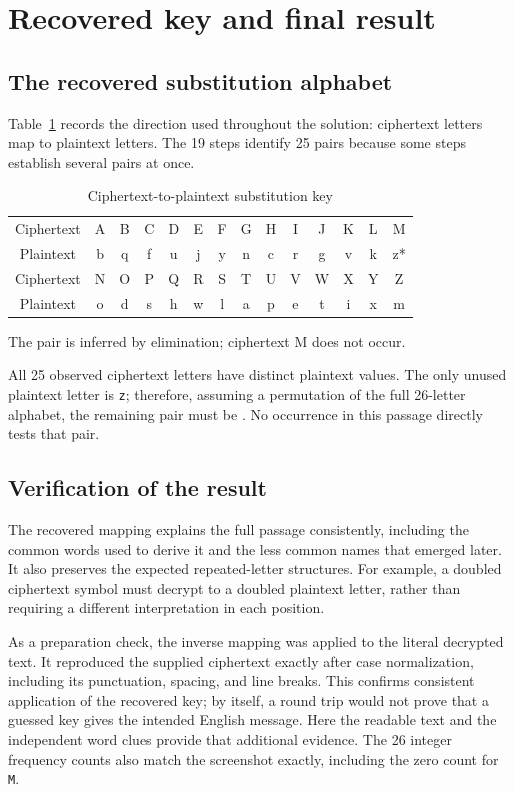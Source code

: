 \section{Recovered key and final result}
\subsection{The recovered substitution alphabet}
Table~\ref{tab:key} records the direction used throughout the solution: ciphertext letters map to plaintext letters. The 19 steps identify 25 pairs because some steps establish several pairs at once.

\begin{table}[htbp]
\centering
\caption{Ciphertext-to-plaintext substitution key}
\label{tab:key}
\small
\begin{tabular}{c*{13}{c}}
\hline
Ciphertext & A & B & C & D & E & F & G & H & I & J & K & L & M\\
Plaintext & b & q & f & u & j & y & n & c & r & g & v & k & z*\\
\hline
Ciphertext & N & O & P & Q & R & S & T & U & V & W & X & Y & Z\\
Plaintext & o & d & s & h & w & l & a & p & e & t & i & x & m\\
\hline
\end{tabular}
\par\smallskip\footnotesize *The pair  is inferred by elimination; ciphertext M does not occur.
\end{table}

All 25 observed ciphertext letters have distinct plaintext values. The only unused plaintext letter is \texttt{z}; therefore, assuming a permutation of the full 26-letter alphabet, the remaining pair must be . No occurrence in this passage directly tests that pair.

\subsection{Verification of the result}
The recovered mapping explains the full passage consistently, including the common words used to derive it and the less common names that emerged later. It also preserves the expected repeated-letter structures. For example, a doubled ciphertext symbol must decrypt to a doubled plaintext letter, rather than requiring a different interpretation in each position.

As a preparation check, the inverse mapping was applied to the literal decrypted text. It reproduced the supplied ciphertext exactly after case normalization, including its punctuation, spacing, and line breaks. This confirms consistent application of the recovered key; by itself, a round trip would not prove that a guessed key gives the intended English message. Here the readable text and the independent word clues provide that additional evidence. The 26 integer frequency counts also match the screenshot exactly, including the zero count for \texttt{M}.


